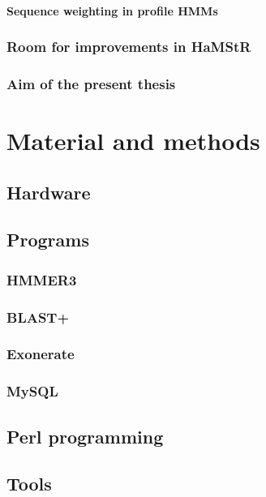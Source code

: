 \documentclass[a4paper,12pt]{scrreprt}
\newcommand{\hamstr}{HaMStR\xspace}
\begin{document}
			\subsubsection{Sequence weighting in profile HMMs}
				
		\subsection{Room for improvements in \hamstr}
			
		\subsection{Aim of the present thesis}
			

\chapter{Material and methods}
	\section{Hardware}
		
	\section{Programs}
		
		\subsection{HMMER3}
			
		\subsection{BLAST+}
			
		\subsection{Exonerate}
			
		\subsection{MySQL}
			
	\section{Perl programming}
		
	\section{Tools}
		
\end{document}
